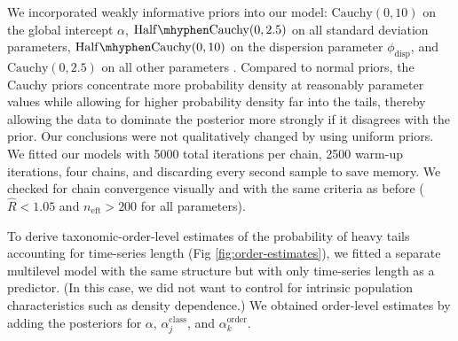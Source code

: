 We incorporated weakly informative priors into our model: $\mathrm{Cauchy}(0, 10)$ on the global intercept $\alpha$, $\mathrm{Half\mhyphen Cauchy}(0, 2.5)$ on all standard deviation parameters, $\mathrm{Half\mhyphen Cauchy}(0, 10)$ on the dispersion parameter $\phi_\mathrm{disp}$, and $\mathrm{Cauchy}(0, 2.5)$ on all other parameters \citep{gelman2006c,gelman2008d}. Compared to normal priors, the Cauchy priors concentrate more probability density at reasonably parameter values while allowing for higher probability density far into the tails, thereby allowing the data to dominate the posterior more strongly if it disagrees with the prior. Our conclusions were not qualitatively changed by using uniform priors. We fitted our models with 5000 total iterations per chain, 2500 warm-up iterations, four chains, and discarding every second sample to save memory. We checked for chain convergence visually and with the same criteria as before ($\widehat{R} < 1.05$ and $n_\mathrm{eft} >200$ for all parameters).

To derive taxonomic-order-level estimates of the probability of heavy tails accounting for time-series length (Fig \ref{fig:order-estimates}), we fitted a separate multilevel model with the same structure but with only time-series length as a predictor. (In this case, we did not want to control for intrinsic population characteristics such as density dependence.) We obtained order-level estimates by adding the posteriors for $\alpha$, $\alpha^\mathrm{class}_j$, and $\alpha^\mathrm{order}_k$.



